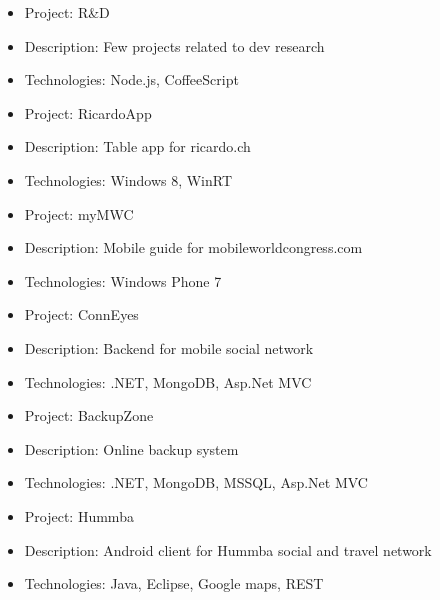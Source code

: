 \documentclass{resume}
\begin{document}
\begin{itemize}
  \item Project: R\&D
  \item Description: Few projects related to dev research
  \item Technologies: Node.js, CoffeeScript
\end{itemize}



\begin{itemize}
  \item Project: RicardoApp 
  \item Description: Table app for ricardo.ch 
  \item Technologies: Windows 8, WinRT
\end{itemize}

\begin{itemize}
  \item Project: myMWC 
  \item Description: Mobile guide for mobileworldcongress.com
  \item Technologies: Windows Phone 7
\end{itemize}

\begin{itemize}
  \item Project: ConnEyes 
  \item Description: Backend for mobile social network
  \item Technologies: .NET, MongoDB, Asp.Net MVC
\end{itemize}

\begin{itemize}
  \item Project: BackupZone 
  \item Description: Online backup system
  \item Technologies: .NET, MongoDB, MSSQL, Asp.Net MVC
\end{itemize}

\begin{itemize}
  \item Project: Hummba 
  \item Description: Android client for Hummba social and travel network
  \item Technologies: Java, Eclipse, Google maps, REST
\end{itemize}


\end{document}

